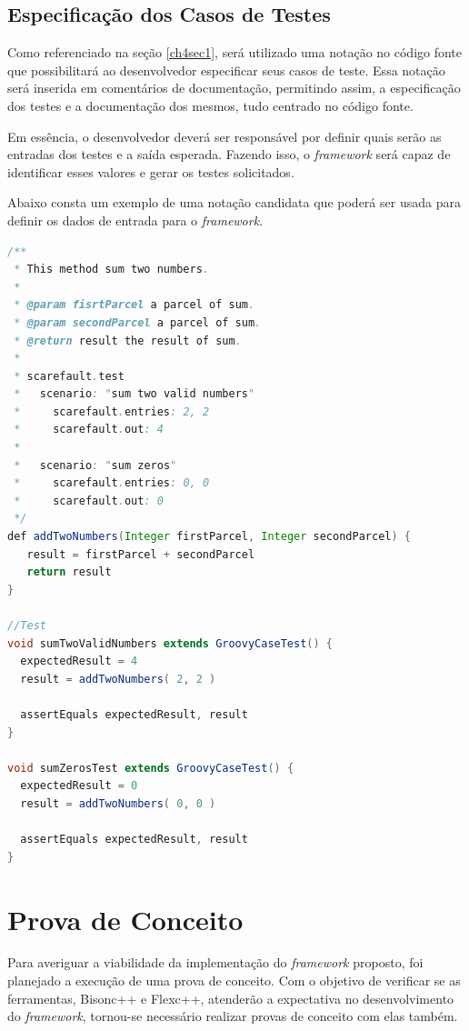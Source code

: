 \subsection{Especificação dos Casos de Testes}
Como referenciado na seção \ref{ch4sec1}, será utilizado uma notação no código fonte que possibilitará ao desenvolvedor especificar seus casos de teste. Essa notação será inserida em comentários de documentação, permitindo assim, a especificação dos testes e a documentação dos mesmos, tudo centrado no código fonte.
\par
\indent Em essência, o desenvolvedor deverá ser responsável por definir quais serão as entradas dos testes e a saída esperada. Fazendo isso, o \textit{framework} será capaz de identificar esses valores e gerar os testes solicitados.
\par
\indent Abaixo consta um exemplo de uma notação candidata que poderá ser usada para definir os dados de entrada para o \textit{framework}.

\begin{lstlisting}[language=java, label=notacaoCandidata, caption={Notação Candidata}]
/**
 * This method sum two numbers.
 * 
 * @param fisrtParcel a parcel of sum.
 * @param secondParcel a parcel of sum.
 * @return result the result of sum.
 * 
 * scarefault.test
 *   scenario: "sum two valid numbers"
 *     scarefault.entries: 2, 2
 *     scarefault.out: 4
 *
 *   scenario: "sum zeros"
 *     scarefault.entries: 0, 0
 *     scarefault.out: 0
 */
def addTwoNumbers(Integer firstParcel, Integer secondParcel) {
   result = firstParcel + secondParcel
   return result
}

//Test
void sumTwoValidNumbers extends GroovyCaseTest() {
  expectedResult = 4
  result = addTwoNumbers( 2, 2 )
  
  assertEquals expectedResult, result
}

void sumZerosTest extends GroovyCaseTest() {
  expectedResult = 0
  result = addTwoNumbers( 0, 0 )
  
  assertEquals expectedResult, result
}
\end{lstlisting}

\section{Prova de Conceito}

Para averiguar a viabilidade da implementação do \textit{framework} proposto, foi planejado a execução de uma prova de conceito. Com o objetivo de verificar se as ferramentas, Bisonc++ e Flexc++, atenderão a expectativa no desenvolvimento do \textit{framework}, tornou-se necessário realizar provas de conceito com elas também. 

